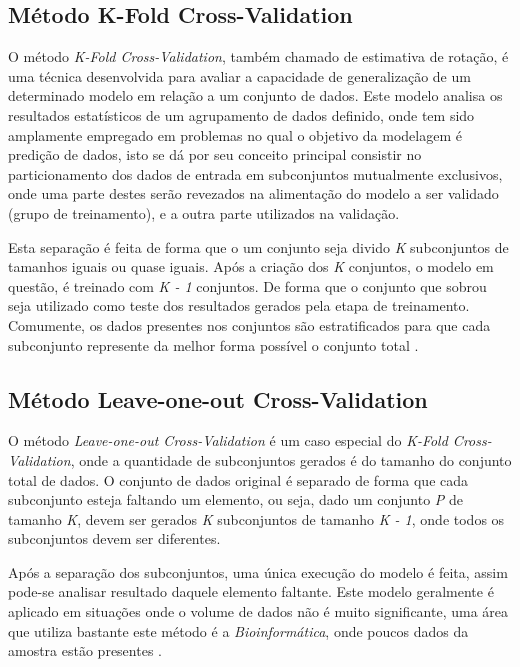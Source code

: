 \subsection{Método K-Fold Cross-Validation}


O método \textsl{K-Fold Cross-Validation}, também chamado de estimativa de rotação, é uma técnica desenvolvida para avaliar a capacidade de generalização de um determinado modelo em relação a um conjunto de dados. Este modelo analisa os resultados estatísticos de um agrupamento de dados definido, onde tem sido amplamente empregado em problemas no qual o objetivo da modelagem é  predição de dados, isto se dá por seu conceito principal consistir no particionamento dos dados de entrada em subconjuntos mutualmente exclusivos, onde uma parte destes serão revezados na alimentação do modelo a ser validado (grupo de treinamento), e a outra parte utilizados na validação.
%

Esta separação é feita de forma que o um conjunto seja divido \textsl{K} subconjuntos de tamanhos iguais ou quase iguais. Após a criação dos \textsl{K} conjuntos, o modelo em questão, é treinado com \textsl{K - 1} conjuntos. De forma que o conjunto que sobrou seja utilizado como teste dos resultados gerados pela etapa de treinamento. Comumente, os dados presentes nos conjuntos são estratificados para que cada subconjunto represente da melhor forma possível o conjunto total \cite{Mudry2011}. 
%

\subsection{Método Leave-one-out Cross-Validation}

O método \textsl{Leave-one-out Cross-Validation} é um caso especial do \textsl{K-Fold Cross-Validation}, onde a quantidade de subconjuntos gerados é do tamanho do conjunto total de dados. O conjunto de dados original é separado de forma que cada subconjunto esteja faltando um elemento, ou seja, dado um conjunto \textsl{P} de tamanho \textsl{K}, devem ser gerados \textsl{K} subconjuntos de tamanho \textsl{K - 1}, onde todos os subconjuntos devem ser diferentes.
%

Após a separação dos subconjuntos, uma única execução do modelo é feita, assim pode-se analisar resultado daquele elemento faltante. Este modelo geralmente é aplicado em situações onde o volume de dados não é muito significante, uma área que utiliza bastante este método é a \textsl{Bioinformática}, onde poucos dados da amostra estão presentes \cite{Mudry2011}. 


